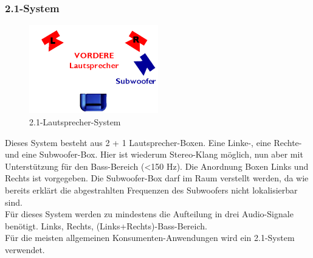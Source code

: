 \subsubsection*{2.1-System}
\begin{figure} [H]
	\centering
	\includegraphics[width=0.5\textwidth]{img/Grundlagen/Mehrweg-Lautsprechersysteme/DOLBYDigital21-cut.jpg}
	\caption{2.1-Lautsprecher-System}
	\label{fig:3.2.4}
\end{figure}

Dieses System besteht aus 2 + 1 Lautsprecher-Boxen.
Eine Linke-, eine Rechte- und eine Subwoofer-Box.
Hier ist wiederum Stereo-Klang möglich, nun aber mit Unterstützung für den Bass-Bereich (<150 Hz).
Die Anordnung Boxen Links und Rechts ist vorgegeben.
Die Subwoofer-Box darf im Raum verstellt werden, da wie bereits erklärt die abgestrahlten Frequenzen des Subwoofers nicht lokalisierbar sind.\\
Für dieses System werden zu mindestens die Aufteilung in drei Audio-Signale benötigt.
Links, Rechts, (Links+Rechts)-Bass-Bereich.\\
Für die meisten allgemeinen Konsumenten-Anwendungen wird ein 2.1-System verwendet.\\ 



